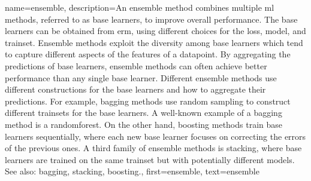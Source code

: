 {name={ensemble}, 
	description={An ensemble method combines multiple 
		\gls{ml} methods, referred to as base learners, to improve overall performance. 
		The base learners can be obtained from \gls{erm}, using different choices for 
	 	the \gls{loss}, \gls{model}, and \gls{trainset}. Ensemble methods exploit the 
	 	diversity among base learners which tend to capture different aspects of the 
		\glspl{feature} of a \gls{datapoint}. By aggregating the \glspl{prediction} of 
		base learners, ensemble methods can often achieve better performance than any 
		single base learner. Different ensemble methods use different constructions for 
		the base learners and how to aggregate their \glspl{prediction}. For example, 
		\gls{bagging} methods use random sampling to construct different \glspl{trainset} 
		for the base learners. A well-known example of a \gls{bagging} method is a 
		\gls{randomforest}. On the other hand, \gls{boosting} methods train base learners 
		sequentially, where each new base learner focuses on correcting the errors of the 
		previous ones. A third family of ensemble methods is stacking, where base learners 
		are trained on the same \gls{trainset} but with potentially different \glspl{model}. 
		\\
	 	See also: \gls{bagging}, \gls{stacking}, \gls{boosting}.},
	 first={ensemble},
	 text={ensemble} 
}

